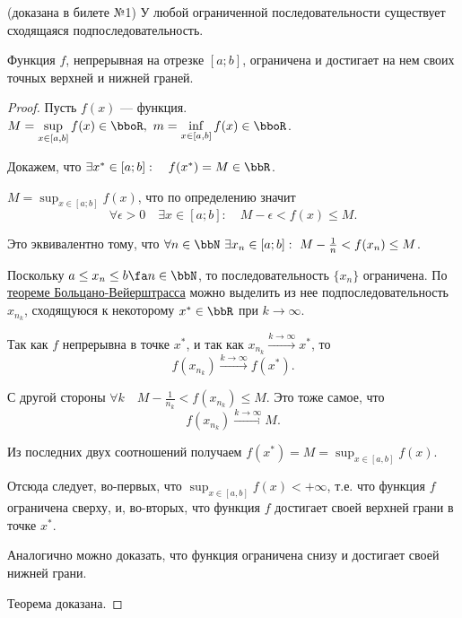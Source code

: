 \begin{thm}\textup{(}доказана в билете №1\textup{)}
У любой ограниченной последовательности существует сходящаяся подпоследовательность.
\end{thm}


\begin{thm} [Вейерштрасса] \label{ch1n1}
Функция $f$, непрерывная на отрезке $[a;b]$, ограничена и достигает на нем своих точных верхней и нижней граней.
\end{thm}
\begin{proof}\leavevmode

Пусть $f(x)$ --- функция. $M = \sup_{x \in [a,b]}\limits f(x) \in \bboR,\  m = \inf_{x \in [a,b]}\limits f(x) \in \bboR$.

Докажем, что $\exists x^* \in [a;b]:\quad f(x^*)= M \in \bbR$.
\smallskip

$M = \sup_{x \in [a;b]}\limits f(x)$, что по определению значит 
$$
\forall\epsilon > 0\quad \exists x\in [a;b]:\quad M-\epsilon < f(x) \le M. 
$$ 

Это эквивалентно тому, что $\forall n \in \bbN\ \exists x_n \in [a;b]:\ M-\frac{1}{n} < f(x_n) \le M $.

Поскольку $ a\le x_n \le b \fa n \in \bbN$, то последовательность $\{x_n\}$ ограничена. По \hyperref[exp9]{теореме Больцано-Вейерштрасса} можно выделить из нее подпоследовательность ${x_{n_k}}$, сходящуюся к некоторому $x^* \in \bbR$ при $k \to \infty$.

Так как $f$ непрерывна в точке $x^*$, и так как $x_{n_k}\xrightarrow{k \to \infty} x^*$, то  
$$
f(x_{n_k}) \xrightarrow{k \to \infty} f(x^*).
$$ 

С другой стороны $\forall k \quad M-\frac{1}{n_k} < f(x_{n_k}) \le M$. Это тоже самое, что
$$
f(x_{n_k}) \xrightarrow{k \to \infty} M.
$$

Из последних двух соотношений получаем $f(x^*) = M = \sup_{x \in [a,b]}\limits f(x) $. 

Отсюда следует, во-первых, что  $\sup_{x \in [a,b]}\limits f(x)<+\infty$, т.е. что функция $f$ ограничена сверху, и, во-вторых, что функция $f$ достигает своей верхней грани в точке $x^*$.

Аналогично можно доказать, что функция ограничена снизу и достигает своей нижней грани.

Теорема доказана.   
\end{proof}
